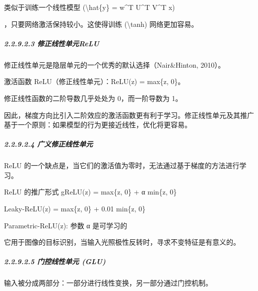 
类似于训练一个线性模型 (\textbackslash hat\{y\} = w\^{}T U\^{}T V\^{}T
x)


，只要网络激活保持较小。这使得训练 (\textbackslash tanh) 网络更加容易。

\subparagraph{\texorpdfstring{\textbf{2.2.9.2.3}
\textbf{修正线性单元ReLU}}{2.2.9.2.3 修正线性单元ReLU}}\label{22923-ux4feeux6b63ux7ebfux6027ux5355ux5143relu}


修正线性单元是隐层单元的一个优秀的默认选择（Nair\&Hinton, 2010）。

激活函数 ReLU（修正线性单元）：ReLU(z) = max\{z, 0\}。

修正线性函数的二阶导数几乎处处为 0，而一阶导数为 1。

因此，梯度方向比引入二阶效应的激活函数更有利于学习。修正线性单元及其推广基于一个原则：如果模型的行为更接近线性，优化将更容易。

\subparagraph{\texorpdfstring{\textbf{2.2.9.2.4}
\textbf{广义修正线性单元}}{2.2.9.2.4 广义修正线性单元}}\label{22924-ux5e7fux4e49ux4feeux6b63ux7ebfux6027ux5355ux5143}


ReLU
的一个缺点是，当它们的激活值为零时，无法通过基于梯度的方法进行学习。

ReLU 的推广形式 gReLU(z) = max\{z, 0\} + α min\{z, 0\}

Leaky-ReLU(z) = max\{z, 0\} + 0.01 min\{z, 0\}

Parametric-ReLU(z): 参数 α 是可学习的

它用于图像的目标识别，当输入光照极性反转时，寻求不变特征是有意义的。

\subparagraph{\texorpdfstring{\textbf{2.2.9.2.5} \textbf{门控线性单元
(GLU)}}{2.2.9.2.5 门控线性单元 (GLU)}}\label{22925-ux95e8ux63a7ux7ebfux6027ux5355ux5143-glu}

输入被分成两部分：一部分进行线性变换，另一部分通过门控机制。

